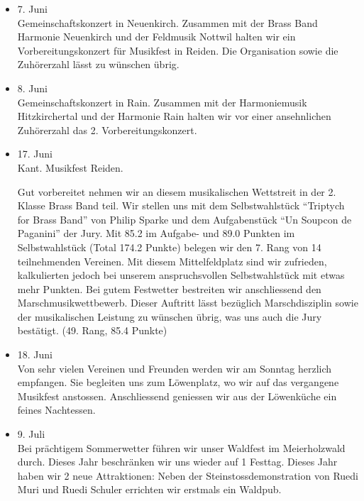 \begin{history}
\begin{itemize}
        \item 7. Juni\\
              Gemeinschaftskonzert in Neuenkirch. Zusammen mit der Brass Band Harmonie
              Neuenkirch und der Feldmusik Nottwil halten wir ein Vorbereitungskonzert
              für Musikfest in Reiden. Die Organisation sowie die Zuhörerzahl lässt zu
              wünschen übrig.

        \item 8. Juni\\
              Gemeinschaftskonzert in Rain. Zusammen mit der Harmoniemusik
              Hitzkirchertal und der Harmonie Rain halten wir vor einer ansehnlichen
              Zuhörerzahl das 2. Vorbereitungskonzert.

        \item 17. Juni\\
              Kant. Musikfest Reiden.

              Gut vorbereitet nehmen wir an diesem musikalischen Wettstreit in der 2.
              Klasse Brass Band teil. Wir stellen uns mit dem Selbstwahlstück
              \enquote{Triptych for Brass Band} von Philip Sparke und dem
              Aufgabenstück \enquote{Un Soupcon de Paganini} der Jury. Mit 85.2 im
              Aufgabe- und 89.0 Punkten im Selbstwahlstück (Total 174.2 Punkte)
              belegen wir den 7. Rang von 14 teilnehmenden Vereinen. Mit diesem
              Mittelfeldplatz sind wir zufrieden, kalkulierten jedoch bei unserem
              anspruchsvollen Selbstwahlstück mit etwas mehr Punkten. Bei gutem
              Festwetter bestreiten wir anschliessend den Marschmusikwettbewerb.
              Dieser Auftritt lässt bezüglich Marschdisziplin sowie der musikalischen
              Leistung zu wünschen übrig, was uns auch die Jury bestätigt. (49. Rang,
              85.4 Punkte)

        \item 18. Juni\\
              Von sehr vielen Vereinen und Freunden werden wir am Sonntag herzlich
              empfangen. Sie begleiten uns zum Löwenplatz, wo wir auf das vergangene
              Musikfest anstossen. Anschliessend geniessen wir aus der Löwenküche ein
              feines Nachtessen.

        \item 9. Juli\\
              Bei prächtigem Sommerwetter führen wir unser Waldfest im Meierholzwald
              durch. Dieses Jahr beschränken wir uns wieder auf 1 Festtag. Dieses Jahr
              haben wir 2 neue Attraktionen: Neben der Steinstossdemonstration von
              Ruedi Muri und Ruedi Schuler errichten wir erstmals ein Waldpub.


\end{itemize}
\end{history}
